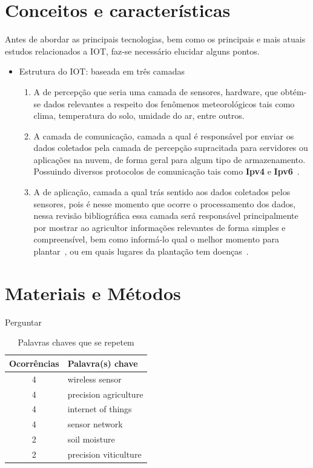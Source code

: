 \documentclass[
article,			%
12pt,				%
oneside,			%
a4paper,			%
english,			%
brazil,				%
sumario=tradicional
]{abntex2}
\begin{document}
\section{Conceitos e características}\label{Conceitos Importantes}
Antes de abordar as principais tecnologias, bem como os principais e mais atuais estudos relacionados a IOT, faz-se necessário elucidar alguns pontos.
\begin{itemize}
  \item Estrutura do IOT: baseada em três camadas~\cite{5}

    \begin{enumerate}
      \item A de percepção que seria uma camada de sensores, hardware, que obtém-se dados relevantes a respeito dos fenômenos meteorológicos tais como clima, temperatura do solo, umidade do ar, entre outros.
      \item A camada de comunicação, camada a qual é responsável por enviar os dados coletados pela camada de percepção supracitada para servidores ou aplicações na nuvem, de forma geral para algum tipo de armazenamento. Possuindo diversos protocolos de comunicação tais como \textbf{Ipv4} e \textbf{Ipv6}~\cite{camada2}.
      \item A de aplicação, camada a qual trás sentido aos dados coletados pelos sensores, pois é nesse momento que ocorre o processamento dos dados, nessa revisão bibliográfica essa camada será responsável principalmente por mostrar ao agricultor informações relevantes de forma simples e compreensível, bem como informá-lo qual o melhor momento para plantar~\cite{1}, ou em quais lugares da plantação tem doenças~\cite{2}.
    \end{enumerate}
\end{itemize}

\section{Materiais e Métodos}\label{Materiais e Métodos}
Perguntar


\begin{table}[!htb]
  \centering
  \caption{Palavras chaves que se repetem}
  \begin{tabular}{|c|l|}
    \hline
    \textbf{Ocorrências} & \textbf{Palavra(s) chave} \\ \hline
    4                    & wireless sensor           \\ \hline
    4                    & precision agriculture     \\ \hline
    4                    & internet of things        \\ \hline
    4                    & sensor network            \\ \hline
    2                    & soil moisture             \\ \hline
    2                    & precision viticulture     \\ \hline
  \end{tabular}
\end{table}
\end{document}
